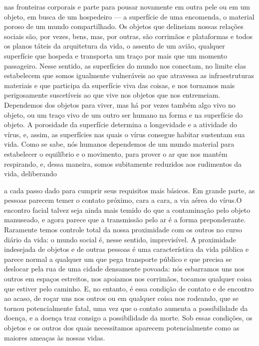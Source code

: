 \begin{multicols}{2}
nas fronteiras
corporais e parte para pousar novamente em outra pele ou em um objeto,
em busca de um hospedeiro --- a superfície de uma encomenda, o material
poroso de um mundo compartilhado. Os objetos que delineiam nossas
relações sociais são, por vezes, bens, mas, por outras, são corrimãos e
plataformas e todos os planos táteis da arquitetura da vida, o assento
de um avião, qualquer superfície que hospeda e transporta um traço por
mais que um momento passageiro. Nesse sentido, as superfícies do mundo
nos conectam, no limite elas estabelecem que somos igualmente
vulneráveis ao que atravessa as infraestruturas materiais e que
participa da superfície viva das coisas, e nos tornamos mais
perigosamente suscetíveis ao que vive nos objetos que nos entremeiam.
Dependemos dos objetos para viver, mas há por vezes também algo vivo no
objeto, ou um traço vivo de um outro ser humano na forma e na superfície
do objeto. A porosidade da superfície determina a longevidade e a
atividade do vírus, e, assim, as superfícies nas quais o vírus consegue
habitar sustentam sua vida. Como se sabe, nós humanos dependemos de um
mundo material para estabelecer o equilíbrio e o movimento, para prover
o ar que nos mantém respirando, e, dessa maneira, somos subitamente reduzidos  aos rudimentos da vida, deliberando

\vspace{\baselineskip}

{\small{}}

\vspace{\baselineskip}

\noindent{}a cada passo dado para
cumprir seus requisitos mais básicos. Em grande parte, as pessoas
parecem temer o contato próximo, cara a cara, a via aérea do vírus.O
encontro facial talvez seja ainda mais temido do que a contaminação pelo
objeto manuseado, e agora parece que a transmissão pelo ar é a forma
preponderante. Raramente temos controle total da nossa proximidade com
os outros no curso diário da vida: o mundo social é, nesse sentido,
imprevisível. A proximidade indesejada de objetos e de outras pessoas é
uma característica da vida pública e parece normal a qualquer um que
pega transporte público e que precisa se deslocar pela rua de uma cidade
densamente povoada: nós esbarramos uns nos outros em espaços estreitos,
nos apoiamos nos corrimãos, tocamos qualquer coisa que estiver pelo
caminho. E, no entanto, é essa condição de contato e de encontro ao
acaso, de roçar uns nos outros ou em qualquer coisa nos rodeando, que se
tornou potencialmente fatal, uma vez que o contato aumenta a
possibilidade da doença, e a doença traz consigo a possibilidade da
morte. Sob essas condições, os objetos e os outros dos quais
necessitamos aparecem potencialmente como as maiores ameaças às nossas
vidas.


\end{multicols}
